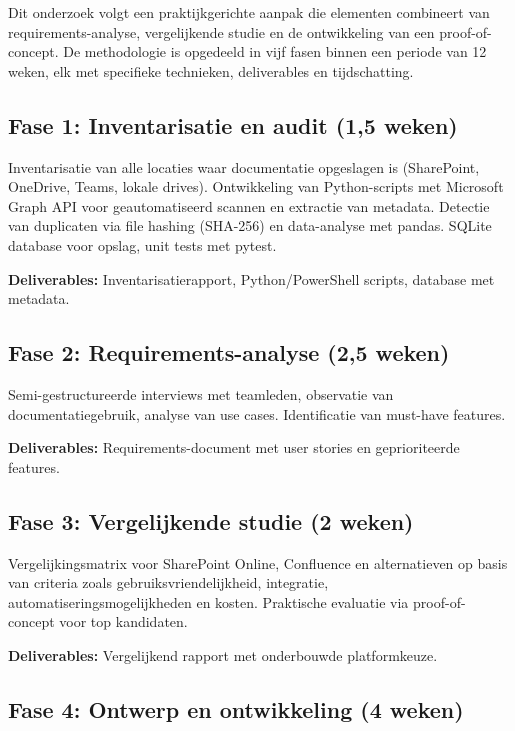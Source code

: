 Dit onderzoek volgt een praktijkgerichte aanpak die elementen combineert van requirements-analyse, vergelijkende studie en de ontwikkeling van een proof-of-concept. De methodologie is opgedeeld in vijf fasen binnen een periode van 12 weken, elk met specifieke technieken, deliverables en tijdschatting.

\subsection{Fase 1: Inventarisatie en audit (1,5 weken)}

Inventarisatie van alle locaties waar documentatie opgeslagen is (Share\-Point, One\-Drive, Teams, lokale drives). Ontwikkeling van Python-scripts met Microsoft Graph API voor geautomatiseerd scannen en extractie van meta\-data. Detectie van duplicaten via file hashing (SHA-256) en data-analyse met pandas. SQLite database voor opslag, unit tests met pytest.

\textbf{Deliverables:} Inventarisatierapport, Python/\allowbreak Power\-Shell scripts, database met metadata.

\subsection{Fase 2: Requirements-analyse (2,5 weken)}

Semi-gestructureerde interviews met teamleden, observatie van documentatiegebruik, analyse van use cases. Identificatie van must-have features.

\textbf{Deliverables:} Requirements-document met user stories en geprioriteerde features.

\subsection{Fase 3: Vergelijkende studie (2 weken)}

Vergelijkingsmatrix voor Share\-Point Online, Confluence en alternatieven op basis van criteria zoals gebruiksvriendelijkheid, integratie, automatiseringsmogelijkheden en kosten. Praktische evaluatie via proof-of-concept voor top kandidaten.

\textbf{Deliverables:} Vergelijkend rapport met onderbouwde platform\-keuze.

\subsection{Fase 4: Ontwerp en ontwikkeling (4 weken)}

